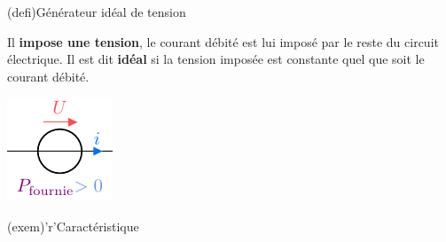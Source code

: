 \documentclass[../../main/main.tex]{subfiles}
\begin{document}
\begin{tcbraster}[raster columns=2, raster equal height=rows]
	\begin{tcb}[label=def:gentens](defi){Générateur idéal de tension}
		\begin{isd}
			Il \textbf{impose une tension}, le courant débité
			est lui imposé par le reste du circuit électrique.
			\tcblower
			Il est dit \textbf{idéal} si la tension imposée est constante quel que
			soit le courant débité.
		\end{isd}
		\begin{center}
			\includegraphics[width=.4\linewidth]{gconvg}
		\end{center}
	\end{tcb}
	\begin{tcb}[label=exem:gentens](exem)'r'{Caractéristique}
		\begin{center}
		\end{center}
	\end{tcb}
\end{tcbraster}
\end{document}
